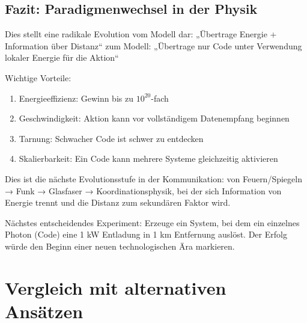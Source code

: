 \documentclass[11pt,a4paper]{article}
\begin{document}
	\subsection{Fazit: Paradigmenwechsel in der Physik}
	
	Dies stellt eine radikale Evolution vom Modell dar:
	„Übertrage Energie + Information über Distanz“
	zum Modell:
	„Übertrage nur Code unter Verwendung lokaler Energie für die Aktion“
	
	Wichtige Vorteile:
	\begin{enumerate}
		\item Energieeffizienz: Gewinn bis zu $10^{20}$-fach
		\item Geschwindigkeit: Aktion kann vor vollständigem Datenempfang beginnen
		\item Tarnung: Schwacher Code ist schwer zu entdecken
		\item Skalierbarkeit: Ein Code kann mehrere Systeme gleichzeitig aktivieren
	\end{enumerate}
	
	Dies ist die nächste Evolutionsstufe in der Kommunikation: von Feuern/Spiegeln → Funk → Glasfaser → Koordinationsphysik, bei der sich Information von Energie trennt und die Distanz zum sekundären Faktor wird.
	
	Nächstes entscheidendes Experiment: Erzeuge ein System, bei dem ein einzelnes Photon (Code) eine 1 kW Entladung in 1 km Entfernung auslöst. Der Erfolg würde den Beginn einer neuen technologischen Ära markieren.
	
	\section{Vergleich mit alternativen Ansätzen}
\end{document}
